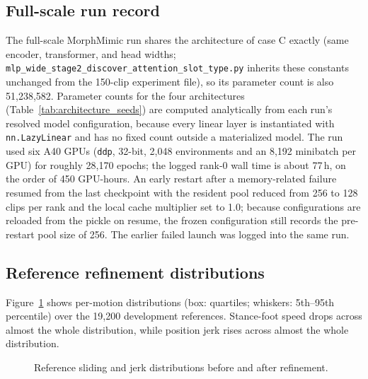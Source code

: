 \subsection{Full-scale run record}
The full-scale MorphMimic run shares the architecture of case C exactly (same
encoder, transformer, and head widths;
\texttt{mlp\_wide\_stage2\_discover\_attention\_slot\_type.py} inherits
these constants unchanged from the 150-clip experiment file), so its
parameter count is also 51,238,582. Parameter counts for the four
architectures (Table~\ref{tab:architecture_seeds}) are computed analytically
from each run's resolved model configuration, because every linear layer is
instantiated with \texttt{nn.LazyLinear} and has no fixed count outside a
materialized model. The run used six A40 GPUs (\texttt{ddp}, 32-bit, 2,048
environments and an 8,192 minibatch per GPU) for roughly 28,170 epochs; the
logged rank-0 wall time is about 77\,h, on the order of 450 GPU-hours. An
early restart after a memory-related failure resumed from the last checkpoint
with the resident pool reduced from 256 to 128 clips per rank and the local
cache multiplier set to 1.0; because configurations are reloaded from the
pickle on resume, the frozen configuration still records the pre-restart pool
size of 256. The earlier failed launch was logged into the same run.

\subsection{Reference refinement distributions}
Figure~\ref{fig:refine_dist} shows per-motion distributions (box: quartiles;
whiskers: 5th--95th percentile) over the 19,200 development references.
Stance-foot speed drops across almost the whole distribution, while position
jerk rises across almost the whole distribution.


\begin{figure}[!htb]
\centering
{}
\caption{Reference sliding and jerk distributions before and after refinement.}\label{fig:refine_dist}
\end{figure}
